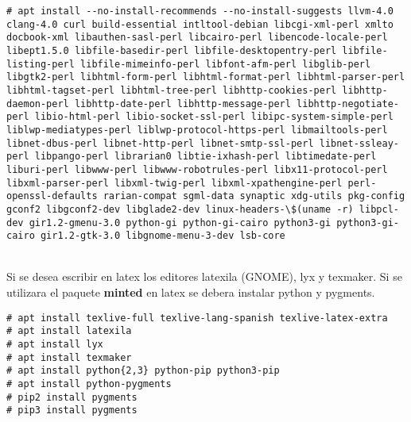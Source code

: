 \begin{verbatim}
# apt install --no-install-recommends --no-install-suggests llvm-4.0 clang-4.0 curl build-essential intltool-debian libcgi-xml-perl xmlto docbook-xml libauthen-sasl-perl libcairo-perl libencode-locale-perl libept1.5.0 libfile-basedir-perl libfile-desktopentry-perl libfile-listing-perl libfile-mimeinfo-perl libfont-afm-perl libglib-perl libgtk2-perl libhtml-form-perl libhtml-format-perl libhtml-parser-perl libhtml-tagset-perl libhtml-tree-perl libhttp-cookies-perl libhttp-daemon-perl libhttp-date-perl libhttp-message-perl libhttp-negotiate-perl libio-html-perl libio-socket-ssl-perl libipc-system-simple-perl liblwp-mediatypes-perl liblwp-protocol-https-perl libmailtools-perl libnet-dbus-perl libnet-http-perl libnet-smtp-ssl-perl libnet-ssleay-perl libpango-perl librarian0 libtie-ixhash-perl libtimedate-perl liburi-perl libwww-perl libwww-robotrules-perl libx11-protocol-perl libxml-parser-perl libxml-twig-perl libxml-xpathengine-perl perl-openssl-defaults rarian-compat sgml-data synaptic xdg-utils pkg-config gconf2 libgconf2-dev libglade2-dev linux-headers-\$(uname -r) libpcl-dev gir1.2-gmenu-3.0 python-gi python-gi-cairo python3-gi python3-gi-cairo gir1.2-gtk-3.0 libgnome-menu-3-dev lsb-core
\end{verbatim}
\\[1em]
Si se desea escribir en latex los editores latexila (GNOME), lyx y texmaker. Si se utilizara el paquete \textbf{minted} en latex se debera instalar python y pygments.
\begin{verbatim}
# apt install texlive-full texlive-lang-spanish texlive-latex-extra 
# apt install latexila
# apt install lyx
# apt install texmaker
# apt install python{2,3} python-pip python3-pip
# apt install python-pygments
# pip2 install pygments
# pip3 install pygments
\end{verbatim}